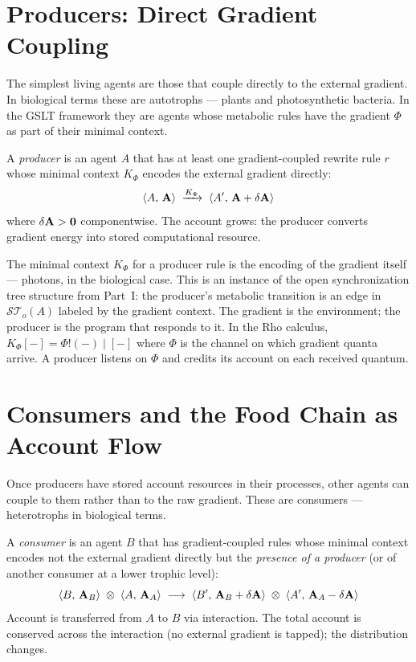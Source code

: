 \section{Producers: Direct Gradient Coupling}

The simplest living agents are those that couple directly to the
external gradient.
In biological terms these are autotrophs --- plants and
photosynthetic bacteria.
In the GSLT framework they are agents whose metabolic rules have
the gradient $\Phi$ as part of their minimal context.

\begin{definition}[Producer]
A \emph{producer} is an agent $A$ that has at least one
gradient-coupled rewrite rule $r$ whose minimal context
$K_\Phi$ encodes the external gradient directly:
\[
  \langle A,\, \mathbf{A} \rangle
  \;\xrightarrow{K_\Phi}\;
  \langle A',\, \mathbf{A} + \delta\mathbf{A} \rangle
\]
where $\delta\mathbf{A} > \mathbf{0}$ componentwise.
The account grows: the producer converts gradient energy into
stored computational resource.
\end{definition}

\begin{remark}
The minimal context $K_\Phi$ for a producer rule is the encoding
of the gradient itself --- photons, in the biological case.
This is an instance of the open synchronization tree structure
from Part~I: the producer's metabolic transition is an edge in
$\mathcal{ST}_o(A)$ labeled by the gradient context.
The gradient is the environment; the producer is the program
that responds to it.
In the Rho calculus, $K_\Phi[-] = \Phi!(- ) \mid [-]$ where
$\Phi$ is the channel on which gradient quanta arrive.
A producer listens on $\Phi$ and credits its account on each
received quantum.
\end{remark}

\section{Consumers and the Food Chain as Account Flow}

Once producers have stored account resources in their processes,
other agents can couple to them rather than to the raw gradient.
These are consumers --- heterotrophs in biological terms.

\begin{definition}[Consumer]
A \emph{consumer} is an agent $B$ that has gradient-coupled
rules whose minimal context encodes not the external gradient
directly but the \emph{presence of a producer} (or of another
consumer at a lower trophic level):
\[
  \langle B,\, \mathbf{A}_B \rangle \;\otimes\;
  \langle A,\, \mathbf{A}_A \rangle
  \;\longrightarrow\;
  \langle B',\, \mathbf{A}_B + \delta\mathbf{A} \rangle \;\otimes\;
  \langle A',\, \mathbf{A}_A - \delta\mathbf{A} \rangle
\]
Account is transferred from $A$ to $B$ via interaction.
The total account is conserved across the interaction (no external
gradient is tapped); the distribution changes.
\end{definition}

